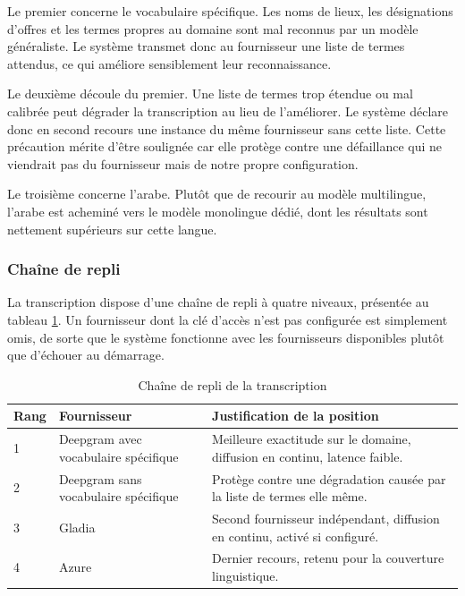 Le premier concerne le vocabulaire spécifique. Les noms de lieux, les désignations d'offres et les termes propres au domaine sont mal reconnus par un modèle généraliste. Le système transmet donc au fournisseur une liste de termes attendus, ce qui améliore sensiblement leur reconnaissance.

Le deuxième découle du premier. Une liste de termes trop étendue ou mal calibrée peut dégrader la transcription au lieu de l'améliorer. Le système déclare donc en second recours une instance du même fournisseur sans cette liste. Cette précaution mérite d'être soulignée car elle protège contre une défaillance qui ne viendrait pas du fournisseur mais de notre propre configuration.

Le troisième concerne l'arabe. Plutôt que de recourir au modèle multilingue, l'arabe est acheminé vers le modèle monolingue dédié, dont les résultats sont nettement supérieurs sur cette langue.

\subsubsection{Chaîne de repli}

La transcription dispose d'une chaîne de repli à quatre niveaux, présentée au tableau \ref{tab:stt-chaine}. Un fournisseur dont la clé d'accès n'est pas configurée est simplement omis, de sorte que le système fonctionne avec les fournisseurs disponibles plutôt que d'échouer au démarrage.

\begin{table}[H]
\centering
\renewcommand{\arraystretch}{1.25}
\begin{tabular}{|p{1.2cm}|p{3.6cm}|p{9.7cm}|}
\hline
\textbf{Rang} & \textbf{Fournisseur} & \textbf{Justification de la position} \\
\hline
1 & Deepgram avec vocabulaire spécifique & Meilleure exactitude sur le domaine, diffusion en continu, latence faible. \\
\hline
2 & Deepgram sans vocabulaire spécifique & Protège contre une dégradation causée par la liste de termes elle même. \\
\hline
3 & Gladia & Second fournisseur indépendant, diffusion en continu, activé si configuré. \\
\hline
4 & Azure & Dernier recours, retenu pour la couverture linguistique. \\
\hline
\end{tabular}
\caption{Chaîne de repli de la transcription}
\label{tab:stt-chaine}
\end{table}

